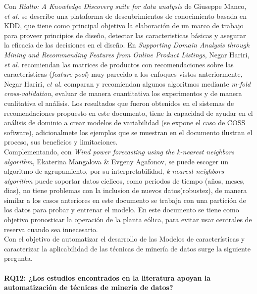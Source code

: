 Con \textit{Rialto: A Knowledge Discovery suite for data analysis}\cite{Manco2016} de Giuseppe Manco, \textit{et al.} se describe una plataforma de descubrimientos de conocimiento basada en KDD, que tiene como principal objetivo la elaboración de un marco de trabajo para proveer principios de diseño, detectar las caracteristicas básicas y asegurar la eficacia de las decisiones en el diseño. En \textit{Supporting Domain Analysis through Mining and Recommending Features from Online Product Listings}\cite{Hariri2013}, Negar Hariri, \textit{et al.} recomiendan las matrices de productos con recomendaciones sobre las caracteristicas (\textit{feature pool}) muy parecido a los enfoques vistos anteriormente\cite{Woznica2012,Liao2008}, Negar Hariri, \textit{et al.} comparan y recomiendan algunos algoritmos mediante \textit{m-fold cross-validation}, evaluar de manera cuantitativa los experimentos y de manera cualitativa el análisis\cite{Bocca2016}. Los resultados que fueron obtenidos en el sistemas de recomendaciones propuesto en este documento, tiene la capacidad de ayudar en el análisis de dominio\cite{Simpson} a crear modelos de variabilidad (se expone el caso de COSS software), adicionalmete los ejemplos que se muestran en el documento ilustran el proceso, sus beneficios y limitaciones. \\
Complementando, con \textit{Wind power forecasting using the k-nearest neighbors algorithm}\cite{Mangalova2014}, Ekaterina Mangalova \& Evgeny Agafonov, se puede escoger un algoritmo de agrupamiento, por su interpretabilidad, \textit{ k-nearest neighbors algorithm} puede soportar datos cíclicos, como periodos de tiempo (años, meses, dias), no tiene problemas con la inclusion de nuevos datos(robustez), de manera similar a los casos anteriores en este documento se trabaja con una partición de los datos para probar y entrenar el modelo. En este documento se tiene como objetivo pronosticar la operación de la planta eólica, para evitar usar centrales de reserva cuando sea innecesario.\\
Con el objetivo de automatizar el desarrollo de las Modelos de características y caracterizar la aplicabilidad de las técnicas de minería de datos surge la siguiente pregunta.
\paragraph{RQ12: ¿Los estudios encontrados en la literatura apoyan la automatización de técnicas de minería de datos? }

